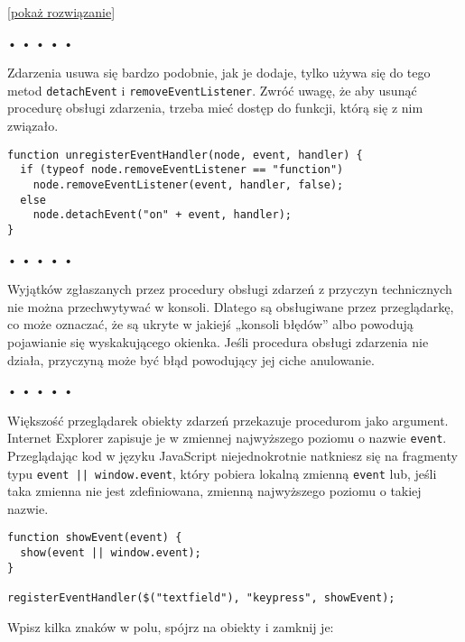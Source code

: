   
[\hyperref[sol:13.1]{pokaż rozwiązanie}]
  


\begin{center}
• • • • •
\end{center}

  
Zdarzenia usuwa się bardzo podobnie, jak je dodaje, tylko używa się do tego metod \texttt{detachEvent} i \texttt{removeEventListener}. Zwróć uwagę, że aby usunąć procedurę obsługi zdarzenia, trzeba mieć dostęp do funkcji, którą się z nim związało.

  
\begin{verbatim} 
function unregisterEventHandler(node, event, handler) {
  if (typeof node.removeEventListener == "function")
    node.removeEventListener(event, handler, false);
  else
    node.detachEvent("on" + event, handler);
}
 \end{verbatim}


\begin{center}
• • • • •
\end{center}

  
Wyjątków zgłaszanych przez procedury obsługi zdarzeń z przyczyn technicznych nie można przechwytywać w konsoli. Dlatego są obsługiwane przez przeglądarkę, co może oznaczać, że są ukryte w jakiejś „konsoli błędów” albo powodują pojawianie się wyskakującego okienka. Jeśli procedura obsługi zdarzenia nie działa, przyczyną może być błąd powodujący jej ciche anulowanie.



\begin{center}
• • • • •
\end{center}

  
Większość przeglądarek obiekty zdarzeń przekazuje procedurom jako argument. Internet Explorer zapisuje je w zmiennej najwyższego poziomu o nazwie \texttt{event}. Przeglądając kod w języku JavaScript niejednokrotnie natkniesz się na fragmenty typu \texttt{event || window.event}, który pobiera lokalną zmienną \texttt{event} lub, jeśli taka zmienna nie jest  zdefiniowana, zmienną najwyższego poziomu o takiej nazwie.

  
\begin{verbatim} 
function showEvent(event) {
  show(event || window.event);
}

registerEventHandler($("textfield"), "keypress", showEvent);
 \end{verbatim}
  
Wpisz kilka znaków w polu, spójrz na obiekty i zamknij je:

